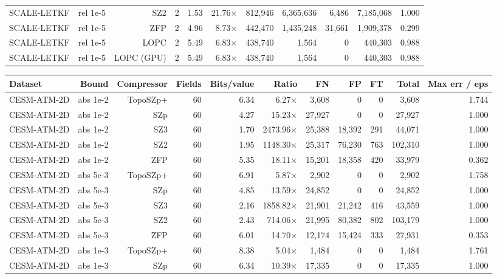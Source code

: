 \begin{tabular}{lrrrrrrrrrr}
SCALE-LETKF & rel 1e-5 & SZ2 & 2 & 1.53 & 21.76$\times$ & 812,946 & 6,365,636 & 6,486 & 7,185,068 & 1.000 \\
SCALE-LETKF & rel 1e-5 & ZFP & 2 & 4.96 & 8.73$\times$ & 442,470 & 1,435,248 & 31,661 & 1,909,378 & 0.299 \\
SCALE-LETKF & rel 1e-5 & LOPC & 2 & 5.49 & 6.83$\times$ & 438,740 & 1,564 & 0 & 440,303 & 0.988 \\
SCALE-LETKF & rel 1e-5 & LOPC (GPU) & 2 & 5.49 & 6.83$\times$ & 438,740 & 1,564 & 0 & 440,303 & 0.988 \\
\bottomrule
\end{tabular}

\begin{tabular}{lrrrrrrrrrr}
\toprule
\textbf{Dataset} & \textbf{Bound} & \textbf{Compressor} & \textbf{Fields} & \textbf{Bits/value} & \textbf{Ratio} & \textbf{FN} & \textbf{FP} & \textbf{FT} & \textbf{Total} & \textbf{Max err / eps} \\
\midrule
CESM-ATM-2D & abs 1e-2 & TopoSZp+ & 60 & 6.34 & 6.27$\times$ & 3,608 & 0 & 0 & 3,608 & 1.744 \\
CESM-ATM-2D & abs 1e-2 & SZp & 60 & 4.27 & 15.23$\times$ & 27,927 & 0 & 0 & 27,927 & 1.000 \\
CESM-ATM-2D & abs 1e-2 & SZ3 & 60 & 1.70 & 2473.96$\times$ & 25,388 & 18,392 & 291 & 44,071 & 1.000 \\
CESM-ATM-2D & abs 1e-2 & SZ2 & 60 & 1.95 & 1148.30$\times$ & 25,317 & 76,230 & 763 & 102,310 & 1.000 \\
CESM-ATM-2D & abs 1e-2 & ZFP & 60 & 5.35 & 18.11$\times$ & 15,201 & 18,358 & 420 & 33,979 & 0.362 \\
CESM-ATM-2D & abs 5e-3 & TopoSZp+ & 60 & 6.91 & 5.87$\times$ & 2,902 & 0 & 0 & 2,902 & 1.758 \\
CESM-ATM-2D & abs 5e-3 & SZp & 60 & 4.85 & 13.59$\times$ & 24,852 & 0 & 0 & 24,852 & 1.000 \\
CESM-ATM-2D & abs 5e-3 & SZ3 & 60 & 2.16 & 1858.82$\times$ & 21,901 & 21,242 & 416 & 43,559 & 1.000 \\
CESM-ATM-2D & abs 5e-3 & SZ2 & 60 & 2.43 & 714.06$\times$ & 21,995 & 80,382 & 802 & 103,179 & 1.000 \\
CESM-ATM-2D & abs 5e-3 & ZFP & 60 & 6.01 & 14.70$\times$ & 12,174 & 15,424 & 333 & 27,931 & 0.353 \\
CESM-ATM-2D & abs 1e-3 & TopoSZp+ & 60 & 8.38 & 5.04$\times$ & 1,484 & 0 & 0 & 1,484 & 1.761 \\
CESM-ATM-2D & abs 1e-3 & SZp & 60 & 6.34 & 10.39$\times$ & 17,335 & 0 & 0 & 17,335 & 1.000 \\

\end{tabular}
